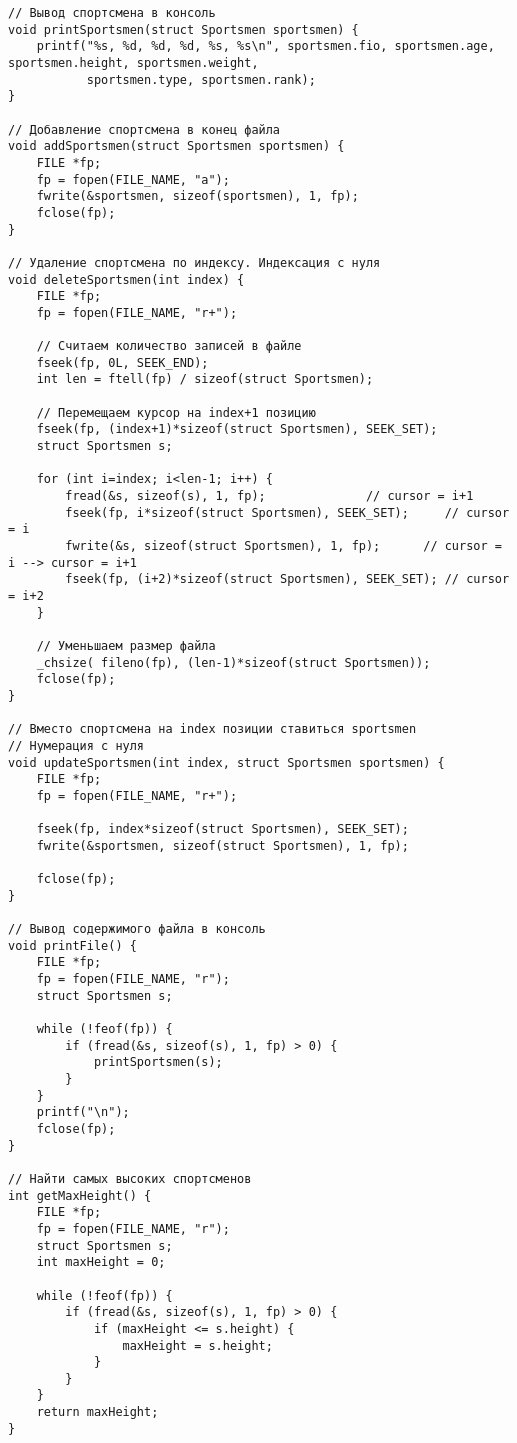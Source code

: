 \documentclass[12pt]{article}
\begin{document}
\begin{lstlisting}[label=structs.h, caption=hw8.c]
// Вывод спортсмена в консоль
void printSportsmen(struct Sportsmen sportsmen) {
    printf("%s, %d, %d, %d, %s, %s\n", sportsmen.fio, sportsmen.age, sportsmen.height, sportsmen.weight,
           sportsmen.type, sportsmen.rank);
}

// Добавление спортсмена в конец файла
void addSportsmen(struct Sportsmen sportsmen) {
    FILE *fp;
    fp = fopen(FILE_NAME, "a");
    fwrite(&sportsmen, sizeof(sportsmen), 1, fp);
    fclose(fp);
}

// Удаление спортсмена по индексу. Индексация с нуля
void deleteSportsmen(int index) {
    FILE *fp;
    fp = fopen(FILE_NAME, "r+");

    // Считаем количество записей в файле
    fseek(fp, 0L, SEEK_END);
    int len = ftell(fp) / sizeof(struct Sportsmen);

    // Перемещаем курсор на index+1 позицию
    fseek(fp, (index+1)*sizeof(struct Sportsmen), SEEK_SET);
    struct Sportsmen s;

    for (int i=index; i<len-1; i++) {
        fread(&s, sizeof(s), 1, fp);              // cursor = i+1
        fseek(fp, i*sizeof(struct Sportsmen), SEEK_SET);     // cursor = i
        fwrite(&s, sizeof(struct Sportsmen), 1, fp);      // cursor = i --> cursor = i+1
        fseek(fp, (i+2)*sizeof(struct Sportsmen), SEEK_SET); // cursor = i+2
    }

    // Уменьшаем размер файла
    _chsize( fileno(fp), (len-1)*sizeof(struct Sportsmen));
    fclose(fp);
}

// Вместо спортсмена на index позиции ставиться sportsmen
// Нумерация с нуля
void updateSportsmen(int index, struct Sportsmen sportsmen) {
    FILE *fp;
    fp = fopen(FILE_NAME, "r+");

    fseek(fp, index*sizeof(struct Sportsmen), SEEK_SET);
    fwrite(&sportsmen, sizeof(struct Sportsmen), 1, fp);

    fclose(fp);
}

// Вывод содержимого файла в консоль
void printFile() {
    FILE *fp;
    fp = fopen(FILE_NAME, "r");
    struct Sportsmen s;

    while (!feof(fp)) {
        if (fread(&s, sizeof(s), 1, fp) > 0) {
            printSportsmen(s);
        }
    }
    printf("\n");
    fclose(fp);
}

// Найти самых высоких спортсменов
int getMaxHeight() {
    FILE *fp;
    fp = fopen(FILE_NAME, "r");
    struct Sportsmen s;
    int maxHeight = 0;

    while (!feof(fp)) {
        if (fread(&s, sizeof(s), 1, fp) > 0) {
            if (maxHeight <= s.height) {
                maxHeight = s.height;
            }
        }
    }
    return maxHeight;
}
\end{lstlisting} 
\end{document}
